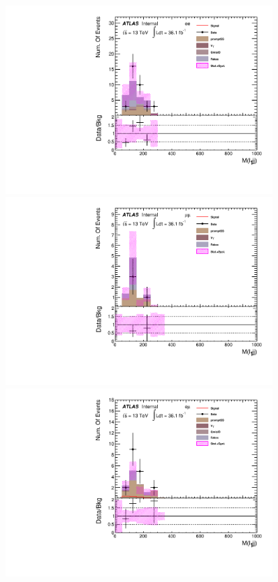 \begin{figure}[h]
\begin{minipage}[t]{0.33\linewidth}
 \centering
 \includegraphics[width=0.9\textwidth,angle=-90]{fig/SigOpt/nonres_m_l1jj_ee.pdf}
 \end{minipage}
 \begin{minipage}[t]{0.33\linewidth}
 \centering
 \includegraphics[width=0.9\textwidth,angle=-90]{fig/SigOpt/nonres_m_l1jj_mumu.pdf}
 \end{minipage}
 \begin{minipage}[t]{0.33\linewidth}
 \centering
 \includegraphics[width=0.9\textwidth,angle=-90]{fig/SigOpt/nonres_m_l1jj_emu.pdf}

\end{minipage}
\end{figure}

